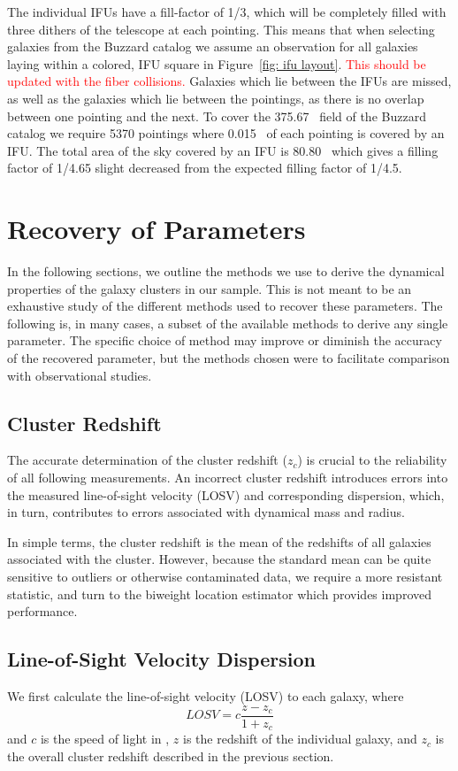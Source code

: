 \documentclass[fleqn,usenatbib]{mnras}
\newcommand{\editorial}[1]{\textcolor{red}{#1}}
\begin{document}
The individual IFUs have a fill-factor of 1/3, which will be completely filled with three dithers of the telescope at each pointing. This means that when selecting galaxies from the Buzzard catalog we assume an observation for all galaxies laying within a colored, IFU square in Figure~\ref{fig: ifu layout}. \editorial{This should be updated with the fiber collisions.} Galaxies which lie between the IFUs are missed, as well as the galaxies which lie between the pointings, as there is no overlap between one pointing and the next. To cover the 375.67 \degsq\ field of the Buzzard catalog we require 5370 pointings where 0.015 \degsq\ of each pointing is covered by an IFU. The total area of the sky covered by an IFU is 80.80 \degsq\ which gives a filling factor of 1/4.65 slight decreased from the expected filling factor of 1/4.5. 

\section{Recovery of Parameters}\label{sec: recovery}
 In the following sections, we outline the methods we use to derive the dynamical properties of the galaxy clusters in our sample. This is not meant to be an exhaustive study of the different methods used to recover these parameters. The following is, in many cases, a subset of the available methods to derive any single parameter. The specific choice of method may improve or diminish the accuracy of the recovered parameter, but the methods chosen were to facilitate comparison with observational studies. 

\subsection{Cluster Redshift}
The accurate determination of the cluster redshift ($z_c$) is crucial to the reliability of all following measurements. An incorrect cluster redshift introduces errors into the measured line-of-sight velocity (LOSV) and corresponding dispersion, which, in turn, contributes to errors associated with dynamical mass and radius. 

In simple terms, the cluster redshift is the mean of the redshifts of all galaxies associated with the cluster. However, because the standard mean can be quite sensitive to outliers or otherwise contaminated data, we require a more resistant statistic, and turn to the biweight location estimator \citep{Beers1990} which provides improved performance. 

\subsection{Line-of-Sight Velocity Dispersion}\label{sec: LOSVD}
We first calculate the line-of-sight velocity (LOSV) to each galaxy, where
\begin{equation}
	LOSV = c\frac{z - z_c}{1+z_c}
\end{equation}
and $c$ is the speed of light in \kms, $z$ is the redshift of the individual galaxy, and $z_c$ is the overall cluster redshift described in the previous section.
\end{document}
